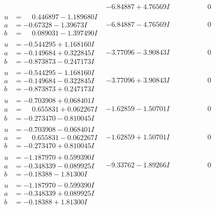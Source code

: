 \documentclass[1p]{elsarticle_modified}
\theoremstyle{definition}
\begin{document}
$$\begin{array}{c|c|c}
 & -6.84887 + 4.76569 I & \phantom{-0.000000 } 0 \\ \hline\begin{aligned}
u &= \phantom{-}0.446897 - 1.189680 I \\
a &= -0.67328 - 1.39673 I \\
b &= \phantom{-}0.089031 - 1.397490 I\end{aligned}
 & -6.84887 - 4.76569 I & \phantom{-0.000000 } 0 \\ \hline\begin{aligned}
u &= -0.544295 + 1.168160 I \\
a &= -0.149684 + 0.322845 I \\
b &= -0.873873 - 0.247173 I\end{aligned}
 & -3.77096 - 3.90843 I & \phantom{-0.000000 } 0 \\ \hline\begin{aligned}
u &= -0.544295 - 1.168160 I \\
a &= -0.149684 - 0.322845 I \\
b &= -0.873873 + 0.247173 I\end{aligned}
 & -3.77096 + 3.90843 I & \phantom{-0.000000 } 0 \\ \hline\begin{aligned}
u &= -0.703908 + 0.068401 I \\
a &= \phantom{-}0.655831 + 0.062267 I \\
b &= -0.273470 - 0.810045 I\end{aligned}
 & -1.62859 - 1.50701 I & \phantom{-0.000000 } 0 \\ \hline\begin{aligned}
u &= -0.703908 - 0.068401 I \\
a &= \phantom{-}0.655831 - 0.062267 I \\
b &= -0.273470 + 0.810045 I\end{aligned}
 & -1.62859 + 1.50701 I & \phantom{-0.000000 } 0 \\ \hline\begin{aligned}
u &= -1.187970 + 0.599390 I \\
a &= -0.348339 - 0.089925 I \\
b &= -0.18388 - 1.81300 I\end{aligned}
 & -9.33762 - 1.89266 I & \phantom{-0.000000 } 0 \\ \hline\begin{aligned}
u &= -1.187970 - 0.599390 I \\
a &= -0.348339 + 0.089925 I \\
b &= -0.18388 + 1.81300 I\end{aligned}

\end{array}$$
\end{document}
